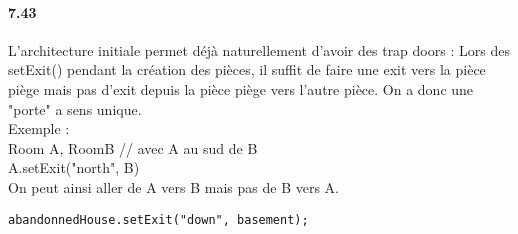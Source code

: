 \documentclass[11pt,a4paper]{report}
\begin{document}
\paragraph{7.43}
L'architecture initiale permet déjà naturellement d'avoir des trap doors : Lors des setExit() pendant la création des pièces, il suffit de faire une exit vers la pièce piège mais pas d'exit depuis la pièce piège vers l'autre pièce. On a donc une "porte" a sens unique. \\
Exemple :\\
Room A, RoomB // avec A au sud de B\\
A.setExit("north", B)\\
On peut ainsi aller de A vers B mais pas de B vers A.
\begin{lstlisting}
abandonnedHouse.setExit("down", basement);
\end{lstlisting}
\end{document}
